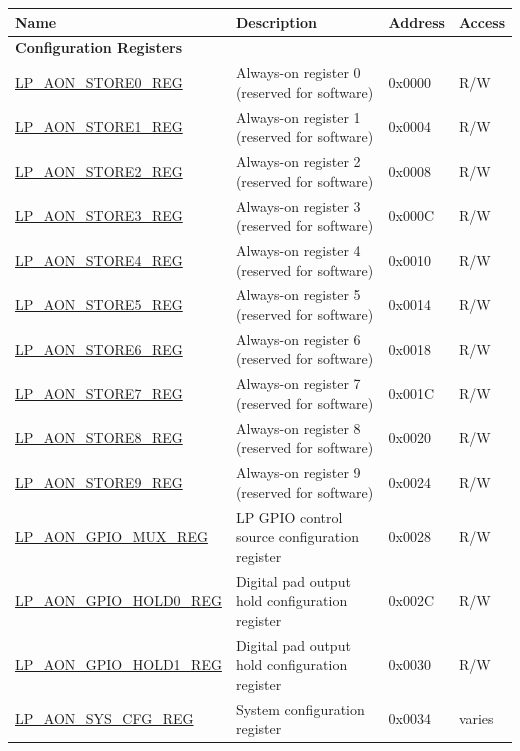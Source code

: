 \begin{longtable}{ | p{6cm} | p{7.2cm} | p{1.3cm} | p{1cm} | }
\hline\rowcolor{lightgray}
Name & Description &  Address & Access \\ \hline
\endhead
\multicolumn{4}{|l|}{\textbf{Configuration Registers}} \\ \hline
\hyperref[regdesc:LPAONSTORENREG]{LP\_AON\_STORE0\_REG} & Always-on register 0 (reserved for software) & 0x0000 & R/W \\ \hline
\hyperref[regdesc:LPAONSTORENREG]{LP\_AON\_STORE1\_REG} & Always-on register 1 (reserved for software) & 0x0004 & R/W \\ \hline
\hyperref[regdesc:LPAONSTORENREG]{LP\_AON\_STORE2\_REG} & Always-on register 2 (reserved for software) & 0x0008 & R/W \\ \hline
\hyperref[regdesc:LPAONSTORENREG]{LP\_AON\_STORE3\_REG} & Always-on register 3 (reserved for software) & 0x000C & R/W \\ \hline
\hyperref[regdesc:LPAONSTORENREG]{LP\_AON\_STORE4\_REG} & Always-on register 4 (reserved for software) & 0x0010 & R/W \\ \hline
\hyperref[regdesc:LPAONSTORENREG]{LP\_AON\_STORE5\_REG} & Always-on register 5 (reserved for software) & 0x0014 & R/W \\ \hline
\hyperref[regdesc:LPAONSTORENREG]{LP\_AON\_STORE6\_REG} & Always-on register 6 (reserved for software) & 0x0018 & R/W \\ \hline
\hyperref[regdesc:LPAONSTORENREG]{LP\_AON\_STORE7\_REG} & Always-on register 7 (reserved for software) & 0x001C & R/W \\ \hline
\hyperref[regdesc:LPAONSTORENREG]{LP\_AON\_STORE8\_REG} & Always-on register 8 (reserved for software) & 0x0020 & R/W \\ \hline
\hyperref[regdesc:LPAONSTORENREG]{LP\_AON\_STORE9\_REG} & Always-on register 9 (reserved for software) & 0x0024 & R/W \\ \hline
\hyperref[regdesc:LPAONGPIOMUXREG]{LP\_AON\_GPIO\_MUX\_REG} & LP GPIO control source configuration register & 0x0028 & R/W \\ \hline
\hyperref[regdesc:LPAONGPIOHOLD0REG]{LP\_AON\_GPIO\_HOLD0\_REG} & Digital pad output hold configuration register & 0x002C & R/W \\ \hline
\hyperref[regdesc:LPAONGPIOHOLD1REG]{LP\_AON\_GPIO\_HOLD1\_REG} & Digital pad output hold configuration register & 0x0030 & R/W \\ \hline
\hyperref[regdesc:LPAONSYSCFGREG]{LP\_AON\_SYS\_CFG\_REG} & System configuration register & 0x0034 & varies \\ \hline

\end{longtable}
